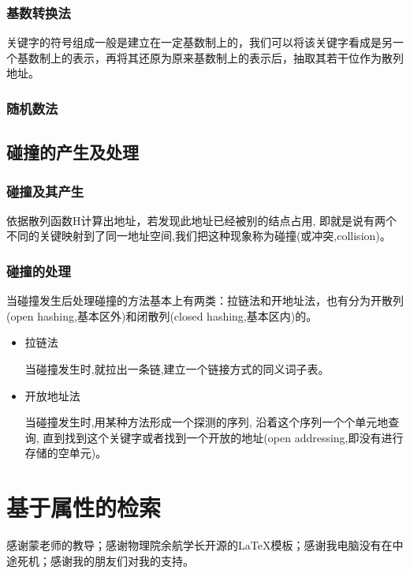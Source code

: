 \documentclass[AutoFakeBold]{LZUThesis2007}
\begin{document}
			\subsubsection{基数转换法}
			关键字的符号组成一般是建立在一定基数制上的，我们可以将该关键字看成是另一个基数制上的表示，再将其还原为原来基数制上的表示后，抽取其若干位作为散列地址。
			\subsubsection{随机数法}


		\subsection{碰撞的产生及处理}
			\subsubsection{碰撞及其产生}		
			依据散列函数H计算出地址，若发现此地址已经被别的结点占用,  即就是说有两个不同的关键映射到了同一地址空间,我们把这种现象称为碰撞(或冲突,collision)。
			\subsubsection{碰撞的处理}
			当碰撞发生后处理碰撞的方法基本上有两类：拉链法和开地址法，也有分为开散列(open hashing,基本区外)和闭散列(closed hashing,基本区内)的。
			\begin{itemize}
				\item 拉链法
				
				当碰撞发生时,就拉出一条链,建立一个链接方式的同义词子表。
				\item 开放地址法
				
				当碰撞发生时,用某种方法形成一个探测的序列, 沿着这个序列一个个单元地查询,  直到找到这个关键字或者找到一个开放的地址(open addressing,即没有进行存储的空单元)。

			\end{itemize}
		\section{基于属性的检索}


\backmatter


\printbib




\Thanks

感谢蒙老师的教导；感谢物理院余航学长开源的LaTeX模板；感谢我电脑没有在中途死机；感谢我的朋友们对我的支持。



\supervisorcomment{}

\recommendedgrade{}

\supervisorsignature{
    \raisebox{-10pt}{
    }
}

\committeecomment{}

\finalgrade{}

\Grade %
\end{document}
